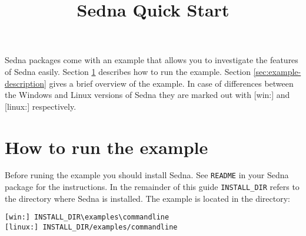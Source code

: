 \documentclass[a4paper,12pt]{article}
\title{Sedna Quick Start}
\date{}
\begin{document}
\sloppy

\maketitle

Sedna packages come with an example that allows you to investigate the features of Sedna easily. 
Section \ref{sec:how-to-run} describes how to run the example. Section \ref{sec:example-description} gives a brief overview of the example. In case of differences between the Windows and Linux versions of Sedna they are marked out with [win:] and [linux:] respectively.

\section{How to run the example}
\label{sec:how-to-run}
Before runing the example you should install Sedna. See \verb!README! in your Sedna package for the instructions.
In the remainder of this guide \verb!INSTALL_DIR! refers to the directory where Sedna is installed.  
The example is located in the directory:

\begin{verbatim}
[win:] INSTALL_DIR\examples\commandline
[linux:] INSTALL_DIR/examples/commandline
\end{verbatim}
\end{document}
